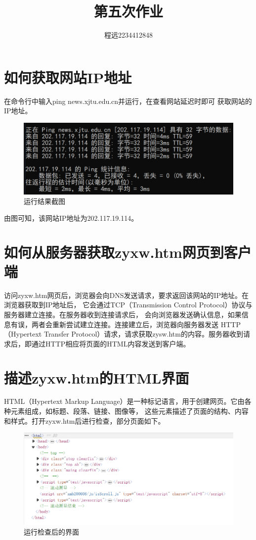 \documentclass[UTF8]{ctexart}
\begin{document}
\title{\vspace{0cm}第五次作业}
\author{程远2234412848}
\date{}
\maketitle

\section{如何获取网站IP地址}
在命令行中输入ping news.xjtu.edu.cn并运行，在查看网站延迟时即可
获取网站的IP地址。

\begin{figure}[h]
    \centering
    \includegraphics[width=1.0\textwidth]{res.png}
    \caption*{运行结果截图}
    \end{figure}
由图可知，该网站IP地址为202.117.19.114。

\section{如何从服务器获取zyxw.htm网页到客户端}
访问zyxw.htm网页后，浏览器会向DNS发送请求，要求返回该网站的IP地址。在浏览器获取到IP地址后，
它会通过TCP（Transmission Control Protocol）协议与服务器建立连接。在服务器收到连接请求后，
会向浏览器发送确认信息，如果信息有误，两者会重新尝试建立连接。连接建立后，浏览器向服务器发送
HTTP（Hypertext Transfer Protocol）请求，请求获取zysw.htm的内容。服务器收到请求后，即通过HTTP相应将页面的HTML内容发送到客户端。

\section{描述zyxw.htm的HTML界面}
HTML（Hypertext Markup Language）是一种标记语言，用于创建网页。它由各种元素组成，如标题、段落、链接、图像等，
这些元素描述了页面的结构、内容和样式。打开zyxw.htm后进行检查，部分页面如下。

\newpage

\begin{figure}[h]
    \centering
    \includegraphics[width=1.0\textwidth]{demo1.png}
    \caption*{运行检查后的界面}
    \end{figure}
\end{document}
